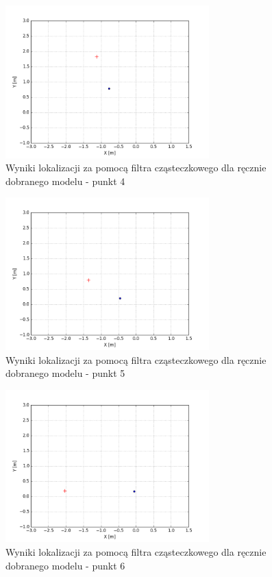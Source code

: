 \begin{figure}[H]
\centering
\includegraphics[width=0.7\textwidth]{img/pf-map3-4.png}
\caption{Wyniki lokalizacji za pomocą filtra cząsteczkowego dla ręcznie dobranego modelu - punkt 4}
\end{figure}
\begin{figure}[H]
\centering
\includegraphics[width=0.7\textwidth]{img/pf-map3-5.png}
\caption{Wyniki lokalizacji za pomocą filtra cząsteczkowego dla ręcznie dobranego modelu - punkt 5}
\end{figure}
\begin{figure}[H]
\centering
\includegraphics[width=0.7\textwidth]{img/pf-map3-6.png}
\caption{Wyniki lokalizacji za pomocą filtra cząsteczkowego dla ręcznie dobranego modelu - punkt 6}
\end{figure}
